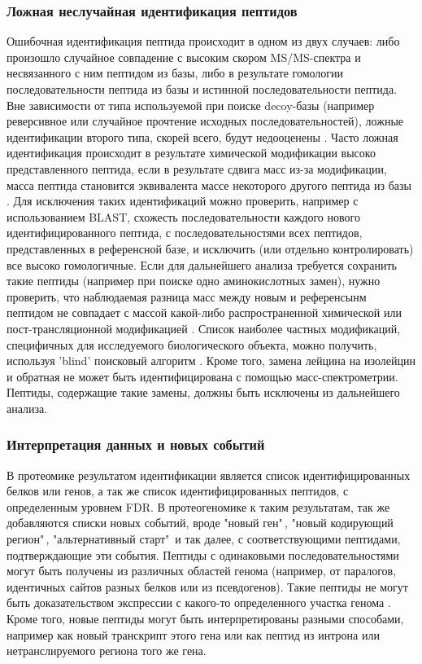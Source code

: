 \subsubsection{Ложная неслучайная идентификация пептидов}
Ошибочная идентификация пептида происходит в одном из двух случаев: либо произошло случайное совпадение с высоким скором MS/MS-спектра и несвязанного с ним пептидом из базы, либо в результате гомологии последовательности пептида из базы и истинной последовательности пептида. Вне зависимости от типа используемой при поиске decoy-базы (например реверсивное или случайное прочтение исходных последовательностей), ложные идентификации второго типа, скорей всего, будут недооценены \cite{nesvizhskii2010survey}. Часто ложная идентификация происходит в результате химической модификации высоко представленного пептида, если в результате сдвига масс из-за модификации, масса пептида становится эквивалента массе некоторого другого пептида из базы \cite{nesvizhskii2006dynamic, abraham2013moving}. Для исключения таких идентификаций можно проверить, например с использованием BLAST, схожесть последовательности каждого нового идентифицированного пептида, с последовательностями всех пептидов, представленных в референсной базе, и исключить (или отдельно контролировать) все высоко гомологичные. Если для дальнейшего анализа требуется сохранить такие пептиды (например при поиске одно аминокислотных замен), нужно проверить, что наблюдаемая разница масс между новым и референсынм пептидом не совпадает с массой какой-либо распространенной химической или пост-трансляционной модификацией \cite{li2011bioinformatics}. Список наиболее частных модификаций, специфичных для исследуемого биологического объекта, можно получить, используя 'blind' поисковый алгоритм \cite{tsur2005identification}. Кроме того, замена лейцина на изолейцин и обратная не может быть идентифицирована с помощью масс-спектрометрии. Пептиды, содержащие такие замены, должны быть исключены из дальнейшего анализа.

\subsubsection{Интерпретация данных и новых событий}
В протеомике результатом идентификации является список идентифицированных белков или генов, а так же список идентифицированных пептидов, с определенным уровнем FDR. В протеогеномике к таким результатам, так же добавляются списки новых событий, вроде "новый ген"\,, "новый кодирующий регион"\,, "альтернативный старт"\  и так далее, с соответствующими пептидами, подтверждающие эти события. Пептиды с одинаковыми последовательностями могут быть получены из различных областей генома (например, от паралогов, идентичных сайтов разных белков или из псевдогенов). Такие пептиды не могут быть доказательством экспрессии с какого-то определенного участка генома \cite{nesvizhskii2005interpretation}. Кроме того, новые пептиды могут быть интерпретированы разными способами, например как новый транскрипт этого гена или как пептид из интрона или нетранслируемого региона того же гена. 

